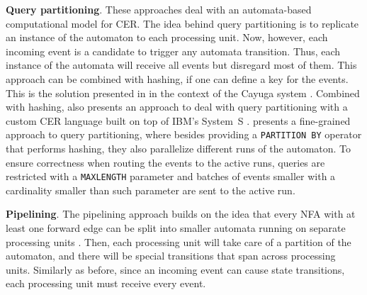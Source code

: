 \textbf{Query partitioning}. These approaches deal with an automata-based computational model for CER. The idea behind query partitioning is to replicate an instance of the automaton to each processing unit. Now, however, each incoming event is a candidate to trigger any automata transition. Thus, each instance of the automata will receive all events but disregard most of them. This approach can be combined with hashing, if one can define a key for the events. This is the solution presented in \cite{DBLP:conf/debs/BrennaGHJ09} in the context of the Cayuga system \cite{DBLP:conf/sigmod/BrennaDGHOPRTW07}. Combined with hashing, \cite{DBLP:conf/debs/Hirzel12} also presents an approach to deal with query partitioning with a custom CER language built on top of IBM's System~S \cite{DBLP:journals/toplas/Hirzel0G17}. \cite{DBLP:conf/debs/BalkesenDWT13} presents a fine-grained approach to query partitioning, where besides providing a \texttt{PARTITION BY} operator that performs hashing, they also parallelize different runs of the automaton. To ensure correctness when routing the events to the active runs, queries are restricted with a \texttt{MAXLENGTH} parameter and batches of events smaller with a cardinality smaller than such parameter are sent to the active run.

\textbf{Pipelining}. The pipelining approach builds on the idea that every NFA with at least one forward edge can be split into smaller automata running on separate processing units \cite{DBLP:conf/debs/BrennaGHJ09}. Then, each processing unit will take care of a partition of the automaton, and there will be special transitions that span across processing units. Similarly as before, since an incoming event can cause state transitions, each processing unit must receive every event.
